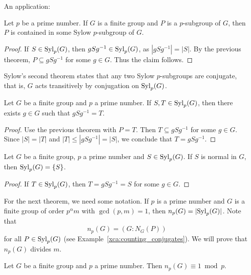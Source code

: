 An application:

\begin{corollary}
    Let $p$ be a prime number. 
    If $G$ is a finite group and 
    $P$ is a $p$-subgroup of $G$, then $P$ 
    is contained in some Sylow $p$-subgroup of $G$.
\end{corollary}

\begin{proof}
If $S\in\mathrm{Syl}_p(G)$, then $gSg^{-1}\in\mathrm{Syl}_p(G)$, as $|gSg^{-1}|=|S|$. 
By the previous theorem, 
$P\subseteq gSg^{-1}$ for some $g\in G$. Thus the claim follows. 
\end{proof}

Sylow's second theorem states 
that any two Sylow $p$-subgroups are conjugate, that 
is, $G$ acts transitively 
by conjugation on $\mathrm{Syl}_p(G)$. 

\begin{theorem}
\label{thm:Sylow2}
Let $G$ be a finite group and $p$ 
a prime number. If 
$S,T\in\mathrm{Syl}_p(G)$, then there exists 
$g\in G$ such that $gSg^{-1}=T$.
\end{theorem}

\begin{proof}
Use the previous theorem with $P=T$. Then
$T\subseteq gSg^{-1}$ for some $g\in G$. Since 
$|S|=|T|$ and 
$|T|\leq |gSg^{-1}|=|S|$, we conclude that
$T=gSg^{-1}$.
\end{proof}

\begin{corollary}
Let $G$ be a finite group, $p$ a prime number and
$S\in\mathrm{Syl}_p(G)$. If $S$ is normal in $G$, then 
$\mathrm{Syl}_p(G)=\{S\}$.
\end{corollary}

\begin{proof}
If $T\in\mathrm{Syl}_p(G)$, then $T=gSg^{-1}=S$ for some $g\in G$.
\end{proof}

For the next theorem, we need some notation. If $p$
is a prime number and $G$ is a finite group of order
$p^\alpha m$ with $\gcd(p,m)=1$, then
$n_p(G)=|\mathrm{Syl}_p(G)|$. Note that 
\[
n_p(G)=(G:N_G(P))
\]
for all $P\in\mathrm{Syl}_p(G)$ (see Example~\ref{xca:counting_conjugates}). We will prove that
$n_p(G)$ divides $m$.

\begin{theorem}
\label{thm:Sylow3}
Let $G$ be a finite group and $p$ a prime number. 
Then $n_p(G)\equiv 1\bmod p$.
\end{theorem}

